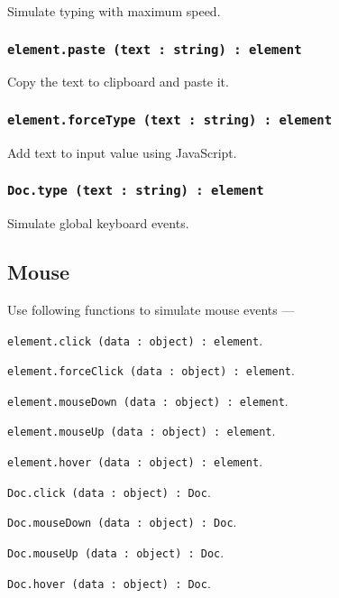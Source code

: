 Simulate typing with maximum speed.

\subsubsection{\texttt{element.paste (text : string) : element}}

Copy the text to clipboard and paste it.

\subsubsection{\texttt{element.forceType (text : string) : element}}

Add text to input value using JavaScript.

\subsubsection{\texttt{Doc.type (text : string) : element}}

Simulate global keyboard events.

\subsection{Mouse}
\label{mouse}

Use following functions to simulate mouse events —
\begin{icItems}
	\item \texttt{element.click (data : object) : element}.
	\item \texttt{element.forceClick (data : object) : element}.
	\item \texttt{element.mouseDown (data : object) : element}.
	\item \texttt{element.mouseUp (data : object) : element}.
	\item \texttt{element.hover (data : object) : element}.
	\item \texttt{Doc.click (data : object) : Doc}.
	\item \texttt{Doc.mouseDown (data : object) : Doc}.
	\item \texttt{Doc.mouseUp (data : object) : Doc}.
	\item \texttt{Doc.hover (data : object) : Doc}.
\end{icItems}

